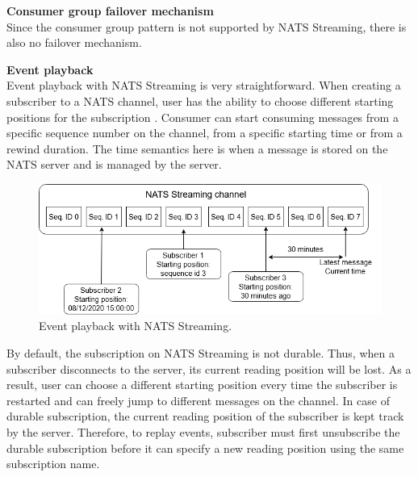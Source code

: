 \textbf{Consumer group failover mechanism}\\
Since the consumer group pattern is not supported by NATS Streaming, there is also no failover mechanism.

\textbf{Event playback}\\
Event playback with NATS Streaming is very straightforward. When creating a subscriber to a NATS channel, user has the ability to choose different starting positions for the subscription \cite{natsdevelopingreceivemessage}. Consumer can start consuming messages from a specific sequence number on the channel, from a specific starting time or from a rewind duration. The time semantics here is when a message is stored on the NATS server and is managed by the server.
\begin{figure}[h]
	\centering
	\includegraphics[width=\linewidth]{images/event-playback-nats.png}
	\caption{Event playback with NATS Streaming.}
	\label{fig:natseventplayback}
\end{figure}

By default, the subscription on NATS Streaming is not durable. Thus, when a subscriber disconnects to the server, its current reading position will be lost. As a result, user can choose a different starting position every time the subscriber is restarted and can freely jump to different messages on the channel. In case of durable subscription, the current reading position of the subscriber is kept track by the server. Therefore, to replay events, subscriber must first unsubscribe the durable subscription before it can specify a new reading position using the same subscription name.







